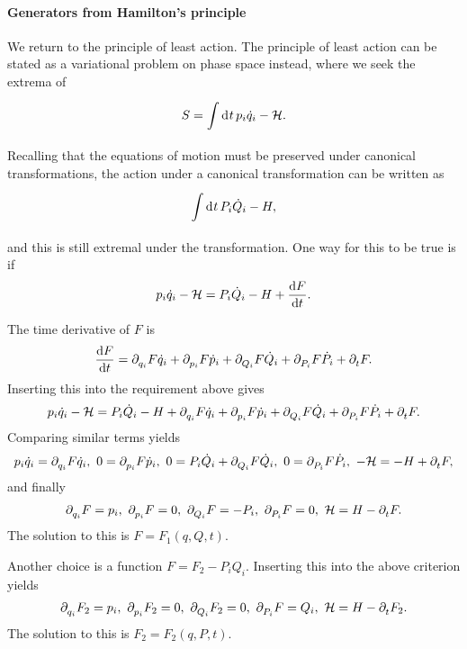 \paragraph{Generators from Hamilton's principle}
We return to the principle of least action. The principle of least action can be stated as a variational problem on phase space instead, where we seek the extrema of
\begin{align*}
	S = \int\limits_{}^{}\dd[]{t}p_{i}\dot{q}_{i} - \mathcal{H}.
\end{align*}
Recalling that the equations of motion must be preserved under canonical transformations, the action under a canonical transformation can be written as
\begin{align*}
	\int\limits_{}^{}\dd[]{t}P_{i}\dot{Q}_{i} - H,
\end{align*}
and this is still extremal under the transformation. One way for this to be true is if
\begin{align*}
	p_{i}\dot{q}_{i} - \mathcal{H} = P_{i}\dot{Q}_{i} - H + \dv{F}{t}.
\end{align*}

The time derivative of $F$ is
\begin{align*}
	\dv{F}{t} = \partial^{}_{q_{i}}F\dot{q}_{i} + \partial^{}_{p_{i}}F\dot{p}_{i} + \partial^{}_{Q_{i}}F\dot{Q}_{i} + \partial^{}_{P_{i}}F\dot{P}_{i} + \partial^{}_{t}F.
\end{align*}
Inserting this into the requirement above gives
\begin{align*}
	p_{i}\dot{q}_{i} - \mathcal{H} = P_{i}\dot{Q}_{i} - H + \partial^{}_{q_{i}}F\dot{q}_{i} + \partial^{}_{p_{i}}F\dot{p}_{i} + \partial^{}_{Q_{i}}F\dot{Q}_{i} + \partial^{}_{P_{i}}F\dot{P}_{i} + \partial^{}_{t}F.
\end{align*}
Comparing similar terms yields
\begin{align*}
	p_{i}\dot{q}_{i} = \partial^{}_{q_{i}}F\dot{q}_{i},\ 0 = \partial^{}_{p_{i}}F\dot{p}_{i},\ 0 = P_{i}\dot{Q}_{i} + \partial^{}_{Q_{i}}F\dot{Q}_{i},\ 0 = \partial^{}_{P_{i}}F\dot{P}_{i},\ -\mathcal{H} = -H + \partial^{}_{t}F, 
\end{align*}
and finally
\begin{align*}
	\partial^{}_{q_{i}}F = p_{i},\ \partial^{}_{p_{i}}F = 0,\ \partial^{}_{Q_{i}}F = -P_{i},\ \partial^{}_{P_{i}}F = 0,\ \mathcal{H} = H - \partial^{}_{t}F.
\end{align*}
The solution to this is $F = F_{1}(q, Q, t)$.

Another choice is a function $F = F_{2} - P_{i}Q_{i}$. Inserting this into the above criterion yields
\begin{align*}
	\del{q_{i}}{F_{2}} = p_{i},\ \del{p_{i}}{F_{2}} = 0,\ \del{Q_{i}}{F_{2}} = 0,\ \del{P_{i}}{F} = Q_{i},\ \ham = H - \del{t}{F_{2}}.
\end{align*}
The solution to this is $F_{2} = F_{2}(q, P, t)$.

